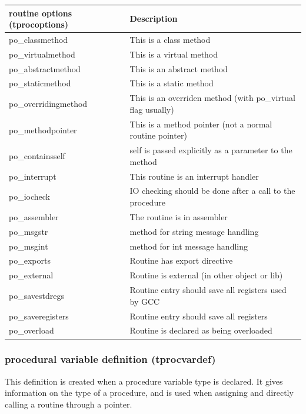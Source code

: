 \documentclass [12pt]{article}
\begin{document}
\begin{longtable}{|l|p{10cm}|}
\hline
routine options (tprocoptions) & Description \\
\hline
\endhead
\hline
\endfoot
\textsf{po{\_}classmethod}   & This is a class method \\
\textsf{po{\_}virtualmethod }& This is a virtual method \\
\textsf{po{\_}abstractmethod}& This is an abstract method \\
\textsf{po{\_}staticmethod}  & This is a static method \\
\textsf{po{\_}overridingmethod}& 
	This is an overriden method (with po{\_}virtual flag usually) \\
\textsf{po{\_}methodpointer}& 
	This is a method pointer (not a normal routine pointer) \\
\textsf{po{\_}containsself}& 
	self is passed explicitly as a parameter to the method \\
\textsf{po{\_}interrupt}& 
	This routine is an interrupt handler \\
\textsf{po{\_}iocheck}& 
	IO checking should be done after a call to the procedure \\
\textsf{po{\_}assembler}& 
	The routine is in assembler \\
\textsf{po{\_}msgstr}& 
	method for string message handling \\
\textsf{po{\_}msgint}& 
	method for int message handling \\
\textsf{po{\_}exports}& 
	Routine has export directive  \\
\textsf{po{\_}external}& 
	Routine is external (in other object or lib) \\
\textsf{po{\_}savestdregs}& 
	Routine entry should save all registers used by GCC \\
\textsf{po{\_}saveregisters}& 
	Routine entry should save all registers \\
\textsf{po{\_}overload}& 
	Routine is declared as being overloaded \\
\end{longtable}

\subsubsection{procedural variable definition (tprocvardef)}
\label{subsubsec:procedural}

This definition is created when a procedure variable type is declared. It 
gives information on the type of a procedure, and is used when assigning and 
directly calling a routine through a pointer.
\end{document}
